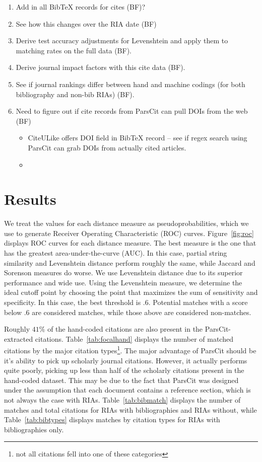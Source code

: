 \documentclass[12pt]{article}
\begin{document}
\begin{enumerate}
\item Add in all BibTeX records for cites (BF)?
\item See how this changes over the RIA date (BF)
\item Derive test accuracy adjustments for Levenshtein and apply them to matching rates on the full data (BF).
\item Derive journal impact factors with this cite data (BF).
\item See if journal rankings differ between hand and machine codings (for both bibliography and non-bib RIAs) (BF). 
\item Need to figure out if cite records from ParsCit can pull DOIs from the web (BF)
\begin{itemize}
\item CiteULike offers DOI field in BibTeX record -- see if regex search using ParsCit can grab DOIs from actually cited articles.
\item 
\end{itemize}
\end{enumerate}



\section{Results}
We treat the values for each distance measure as pseudoprobabilities, which we use to generate Receiver Operating Characteristic (ROC) curves. Figure~\ref{fig:roc} displays ROC curves for each distance measure. The best measure is the one that has the greatest area-under-the-curve (AUC). In this case, partial string similarity and Levenshtein distance perform roughly the same, while Jaccard and Sorenson measures do worse. We use Levenshtein distance due to its superior performance and wide use. Using the Levenshtein measure, we determine the ideal cutoff point by choosing the point that maximizes the sum of sensitivity and specificity. In this case, the best threshold is .6. Potential matches with a score below .6 are considered matches, while those above are considered non-matches.

Roughly $41\%$ of the hand-coded citations are also present in the ParsCit-extracted citations. Table~\ref{tab:focalhand} displays the number of matched citations by the major citation types\footnote{not all citations fell into one of these categories}. The major advantage of ParsCit should be it's ability to pick up scholarly journal citations. However, it actually performs quite poorly, picking up less than half of the scholarly citations present in the hand-coded dataset. This may be due to the fact that ParsCit was designed under the assumption that each document contains a reference section, which is not always the case with RIAs. Table~\ref{tab:bibmatch} displays the number of matches and total citations for RIAs with bibliographies and RIAs without, while Table~\ref{tab:bibtypes} displays matches by citation types for RIAs with bibliographies only.
\end{document}
